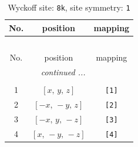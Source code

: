 \documentclass[fleqn,8pt]{jsarticle}
\begin{document}
\begin{longtable}{ccc}
\caption{Wyckoff site: {\tt 8k}, site symmetry: {\tt 1}}
 \\
 \hline \hline
No. & position & mapping \\ \hline \endfirsthead

\multicolumn{2}{l}{\tablename\ \thetable{}} \\
 \hline \hline
No. & position & mapping \\ \hline \endhead

 \hline \hline
\multicolumn{2}{r}{\footnotesize\it continued ...} \\ \endfoot

 \hline \hline
\multicolumn{2}{r}{} \\ \endlastfoot

1 & $\left[ x,\, y,\, z \right]$ & {\tt [1]} \\ \hline
2 & $\left[ - x,\, - y,\, z \right]$ & {\tt [2]} \\ \hline
3 & $\left[ - x,\, y,\, - z \right]$ & {\tt [3]} \\ \hline
4 & $\left[ x,\, - y,\, - z \right]$ & {\tt [4]} \\
\end{longtable}
\end{document}
